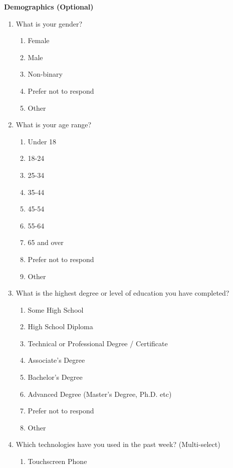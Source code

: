 \documentclass[acmsmall,screen,authorversion,nonacm]{acmart}
\begin{document}
\textbf{Demographics (Optional)}
\begin{enumerate}
    \item What is your gender?
        \begin{enumerate}
            \item Female
            \item Male
            \item Non-binary
            \item Prefer not to respond
            \item Other
        \end{enumerate}
    \item What is your age range?
        \begin{enumerate}
            \item Under 18
            \item 18-24
            \item 25-34
            \item 35-44
            \item 45-54
            \item 55-64
            \item 65 and over
            \item Prefer not to respond
            \item Other
        \end{enumerate}
    \item What is the highest degree or level of education you have completed?
        \begin{enumerate}
            \item Some High School
            \item High School Diploma
            \item Technical or Professional Degree / Certificate
            \item Associate's Degree
            \item Bachelor's Degree
            \item Advanced Degree (Master's Degree, Ph.D. etc)
            \item Prefer not to respond
            \item Other
        \end{enumerate}
    \item Which technologies have you used in the past week? (Multi-select)
        \begin{enumerate}
            \item Touchscreen Phone

\end{enumerate}
\end{enumerate}
\end{document}
